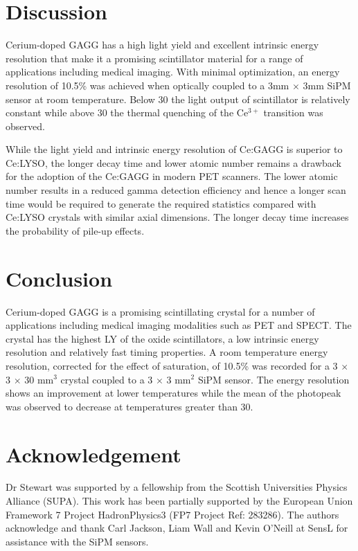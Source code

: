 \documentclass[journal]{IEEEtran}
\begin{document}


\section{Discussion}

Cerium-doped GAGG has a high light yield and excellent intrinsic energy resolution that make it a promising scintillator material for a range of applications including medical imaging. With minimal optimization, an energy resolution of 10.5\% was achieved when optically coupled to a 3mm $\times$ 3mm SiPM sensor at room temperature. Below 30\celsius{} the light output of scintillator is relatively constant while above 30\celsius{} the thermal quenching of the Ce$^{3+}$ transition was observed.  

While the light yield and intrinsic energy resolution of Ce:GAGG is superior to Ce:LYSO, the longer decay time and lower atomic number remains a drawback for the adoption of the Ce:GAGG in modern PET scanners. The lower atomic number results in a reduced gamma detection efficiency and hence a longer scan time would be required to generate the required statistics compared with Ce:LYSO crystals with similar axial dimensions. The longer decay time increases the probability of pile-up effects.

\section{Conclusion}

Cerium-doped GAGG is a promising scintillating crystal for a number of applications including medical imaging modalities such as PET and SPECT. The crystal has the highest LY of the oxide scintillators, a low intrinsic energy resolution and relatively fast timing properties. A room temperature energy resolution, corrected for the effect of saturation, of 10.5\% was recorded for a 3 $\times$ 3 $\times$ 30 mm$^{3}$ crystal coupled to a 3 $\times$ 3 mm$^{2}$ SiPM sensor. The energy resolution shows an improvement at lower temperatures while the mean of the photopeak was observed to decrease at temperatures greater than 30\celsius{}.


\section*{Acknowledgement}
%
Dr Stewart was supported by a fellowship from the \mbox{Scottish} Universities Physics Alliance (SUPA). This work has been partially supported by the European Union Framework 7 Project HadronPhysics3 (FP7 Project Ref: 283286). The authors acknowledge and thank Carl Jackson, Liam Wall and Kevin O'Neill at SensL for assistance with the SiPM sensors. 
\end{document}
